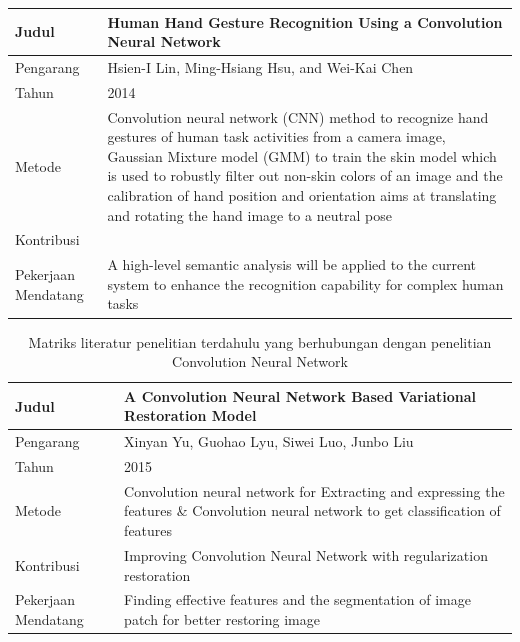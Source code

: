 \begin{table}
\begin{tabular}{ |m{2cm}|m{7cm}|m{1cm}|m{1cm}| }
		Judul & \multicolumn{3}{|m{13cm}|}{Human Hand Gesture Recognition Using a Convolution Neural Network} \\
		\hline
		Pengarang & \multicolumn{3}{|m{13cm}|}{Hsien-I Lin, Ming-Hsiang Hsu, and Wei-Kai Chen} \\ 
		\hline
		Tahun & \multicolumn{3}{|m{13cm}|}{2014} \\ 
		\hline
		Metode & \multicolumn{3}{|m{13cm}|}{Convolution neural network (CNN) method to recognize hand gestures of human task activities from a camera image, Gaussian Mixture model (GMM) to train the skin model which is used to robustly filter out non-skin colors of an image and the calibration of hand position and orientation aims at translating and rotating the hand image to a neutral pose
			}\\
		\hline
		Kontribusi  & \multicolumn{3}{|m{13cm}|}{}\\ 
		\hline
		Pekerjaan Mendatang  & \multicolumn{3}{|m{13cm}|}{A high-level semantic analysis will be applied to the current system to enhance the recognition capability for complex human tasks} \\ 
		\hline\hline
	\end{tabular}
\end{table}
\begin{table}
	\clearpage
	\centering
	\caption{Matriks literatur penelitian terdahulu yang berhubungan dengan penelitian Convolution Neural Network}
	\label{tab:tab1}
	\begin{tabular}{ |m{2cm}|m{7cm}|m{1cm}|m{1cm}| } 		
		Judul & \multicolumn{3}{|m{13cm}|}{A Convolution Neural Network Based Variational Restoration Model} \\
		\hline
		Pengarang & \multicolumn{3}{|m{13cm}|}{Xinyan Yu, Guohao Lyu, Siwei Luo, Junbo Liu} \\ 
		\hline
		Tahun & \multicolumn{3}{|m{13cm}|}{2015} \\ 
		\hline
		Metode & \multicolumn{3}{|m{13cm}|}{Convolution neural network for Extracting and expressing the features \& Convolution neural network to get classification of features
		}\\
		\hline
		Kontribusi  & \multicolumn{3}{|m{13cm}|}{Improving Convolution Neural Network with regularization restoration}\\ 
		\hline
		Pekerjaan Mendatang  & \multicolumn{3}{|m{13cm}|}{Finding effective features and the segmentation of image patch for better restoring image} \\
	\end{tabular}
\end{table}

